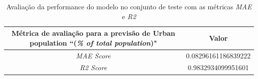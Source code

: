 \begin{table}[h!]
    \centering
    \begin{tabular}{|c|c|}
        \hline
        \multicolumn{1}{|p{5cm}|}{Métrica de avaliação para a previsão de Urban population ``(\emph{\% of total population})"} & Valor \\
        \hline
        \emph{MAE Score} & 0.08296161186839222 \\
        \hline 
        \emph{R2 Score} & 0.9832934099951601 \\
        \hline
    \end{tabular}
    \caption{Avaliação da performance do modelo no conjunto de teste com as métricas \emph{MAE} e \emph{R2}}    
\end{table}